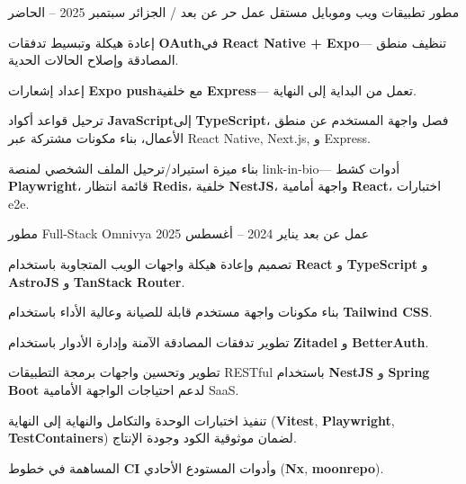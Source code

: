 \begin{cventries}
\begin{Arabic}
  \cventry
  {\textarabic{مطور تطبيقات ويب وموبايل مستقل}}
  {\textarabic{عمل حر}}
  {\textarabic{عن بعد / الجزائر}}
  {\textarabic{سبتمبر 2025 -- الحاضر}}
  {
    \begin{cvitems}
      \item {\textarabic{إعادة هيكلة وتبسيط تدفقات} \textenglish{\textbf{OAuth}}\textarabic{في} \textenglish{\textbf{React Native + Expo}}\textarabic{— تنظيف منطق المصادقة وإصلاح الحالات الحدية}.}
      \item {\textarabic{إعداد إشعارات} \textenglish{\textbf{Expo push}}\textarabic{مع خلفية} \textenglish{\textbf{Express}}\textarabic{— تعمل من البداية إلى النهاية}.}
      \item {\textarabic{ترحيل قواعد أكواد} \textenglish{\textbf{JavaScript}}\textarabic{إلى} \textenglish{\textbf{TypeScript}}\textarabic{، فصل واجهة المستخدم عن منطق الأعمال، بناء مكونات مشتركة عبر} \textenglish{React Native, Next.js,} \textarabic{و} \textenglish{Express}.}
      \item {\textarabic{بناء ميزة استيراد/ترحيل الملف الشخصي لمنصة} \textenglish{link-in-bio}\textarabic{— أدوات كشط} \textenglish{\textbf{Playwright}}\textarabic{، قائمة انتظار} \textenglish{\textbf{Redis}}\textarabic{، خلفية} \textenglish{\textbf{NestJS}}\textarabic{، واجهة أمامية} \textenglish{\textbf{React}}\textarabic{، اختبارات} \textenglish{e2e}.}
    \end{cvitems}
  }

  \cventry
  {\textarabic{مطور} \textenglish{Full-Stack}}
  {\textenglish{Omnivya}}
  {\textarabic{عمل عن بعد}}
  {\textarabic{يناير 2024 -- أغسطس 2025}}
  {
    \begin{cvitems}
      \item {\textarabic{تصميم وإعادة هيكلة واجهات الويب المتجاوبة باستخدام} \textenglish{\textbf{React}} \textarabic{و} \textenglish{\textbf{TypeScript}} \textarabic{و} \textenglish{\textbf{AstroJS}} \textarabic{و} \textenglish{\textbf{TanStack Router}}.}
      \item {\textarabic{بناء مكونات واجهة مستخدم قابلة للصيانة وعالية الأداء باستخدام} \textenglish{\textbf{Tailwind CSS}}.}
      \item {\textarabic{تطوير تدفقات المصادقة الآمنة وإدارة الأدوار باستخدام} \textenglish{\textbf{Zitadel}} \textarabic{و} \textenglish{\textbf{BetterAuth}}.}
      \item {\textarabic{تطوير وتحسين واجهات برمجة التطبيقات} \textenglish{RESTful} \textarabic{باستخدام} \textenglish{\textbf{NestJS}} \textarabic{و} \textenglish{\textbf{Spring Boot}} \textarabic{لدعم احتياجات الواجهة الأمامية} \textenglish{SaaS}.}
      \item {\textarabic{تنفيذ اختبارات الوحدة والتكامل والنهاية إلى النهاية} (\textenglish{\textbf{Vitest}, \textbf{Playwright}, \textbf{TestContainers}}) \textarabic{لضمان موثوقية الكود وجودة الإنتاج}.}
      \item {\textarabic{المساهمة في خطوط} \textenglish{\textbf{CI}} \textarabic{وأدوات المستودع الأحادي} (\textenglish{\textbf{Nx}, \textbf{moonrepo}})\textarabic{.}}
    \end{cvitems}
  }

  \end{Arabic}
\end{cventries}
